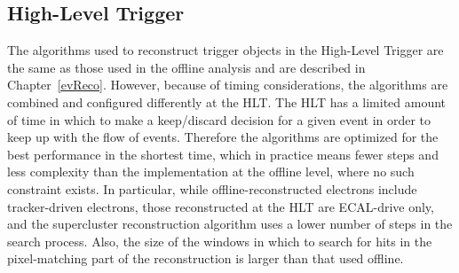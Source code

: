 \subsection{High-Level Trigger}
\label{evSel:HLT}


The algorithms used to reconstruct trigger objects 
in the High-Level Trigger are the same as those 
used in the offline analysis and are described in Chapter~\ref{evReco}.  
However, because of timing considerations, 
the algorithms are combined and configured differently at the HLT.  
The HLT has a limited amount of time in which to 
make a keep/discard decision for a given event 
in order to keep up with the flow of events.  
Therefore the algorithms are optimized for the best 
performance in the shortest time, 
which in practice means fewer steps and less 
complexity than the implementation at the offline level, 
where no such constraint exists.  
In particular, while offline-reconstructed electrons 
include tracker-driven electrons, 
those reconstructed at the HLT are ECAL-drive only, 
and the supercluster reconstruction algorithm uses 
a lower number of steps in the search process.  
Also, the size of the windows in which to search for 
hits in the pixel-matching part of the 
reconstruction is larger than that used offline.  





